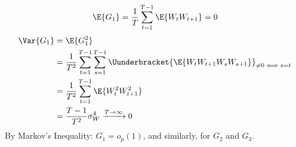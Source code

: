 \begin{Example}{}{}
    \[ \E{G_{1}}=\frac{1}{T} \sum_{t=1}^{T-1} \E{W_{t}W_{t+1}}=0 \]
    \begin{align*}
        \Var{G_{1}}
         & =\E{G_{1}^2}                                                                                                \\
         & =\frac{1}{T^2}\sum_{t=1}^{T-1} \sum_{s=1}^{T-1}\Uunderbracket{\E{W_{t}W_{t+1}W_{s}W_{s+1}}}_{\ne 0\iff s=t} \\
         & =\frac{1}{T^2} \sum_{t=1}^{T-1} \E{W_t^2 W_{t+1}^2}                                                         \\
         & =\frac{T-1}{T^2} \sigma_W^4\xrightarrow{T\to\infty}0
    \end{align*}
    By Markov's Inequality:
    $ G_{1}=o_p(1) $,
    and similarly, for $ G_{2} $ and $ G_{3} $.
\end{Example}
